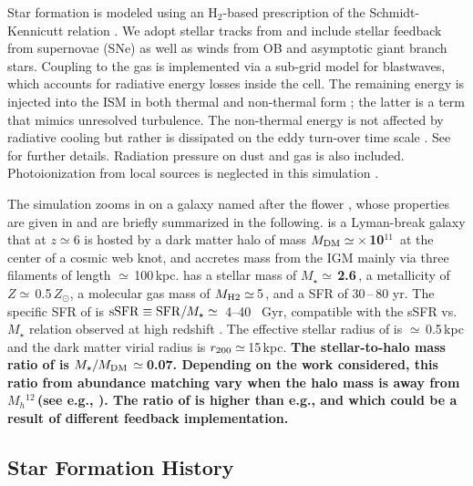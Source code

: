 \IfFileExists{emulateapjlegacy.cls}{\documentclass[iop]{emulateapjlegacy}}{\documentclass[iop]{emulateapj}}
\begin{document}
Star formation is modeled using an H$_2$-based prescription of the Schmidt-Kennicutt relation \citep{Krumholz09a}. We adopt stellar tracks from  and include stellar feedback from supernovae (SNe) as well as winds from OB and asymptotic giant branch stars. Coupling to the gas is implemented via a sub-grid model for blastwaves, which accounts for radiative energy losses inside the cell.
%
The remaining energy is injected into the ISM in both thermal and non-thermal form \citep{Agertz13a}; the latter is a term that mimics unresolved turbulence. The non-thermal energy is not affected by radiative cooling but rather is dissipated on the eddy turn-over time scale \citep{Maclow99a}. See \citet{Pallottini17b} for further details.
%
Radiation pressure on dust and gas is also included. Photoionization from local sources is neglected in this simulation \citep[see][for its effect]{Pallottini19a, Decataldo19a}.

The simulation zooms in on a galaxy named after the flower \flower, whose properties are given in \citet{Pallottini17a} and are briefly summarized in the following. \flower is a Lyman-break galaxy that at $z\simeq 6$ is hosted by a dark matter halo of mass 
{\bf $M_{\rm DM}\simeq$\,$\times$\,10$^{11}$\,\Msun} at the center of a cosmic web knot, and accretes mass from the IGM mainly via three filaments of length $\simeq$\,100\,kpc. \flower has a stellar mass of {\bf $M_\star\simeq$\,2.6\,\Msun}, a metallicity of $Z\simeq$\,0.5\,$Z_{\odot}$, a molecular gas mass of $M_{\rm H2}\simeq$\,5\,\Msun, and a SFR of 30\,--\,80\,\Msun\,yr\pmOne.
%
The specific SFR of \flower is ${\rm sSFR} \equiv {\rm SFR}/M_{\star} \simeq$~4--40 ~Gyr\pmOne, compatible with the sSFR vs.\ $M_{\star}$ relation observed at high redshift \citep{Jiang16a}. The effective stellar radius of \flower is $\simeq$\,0.5\,kpc and the dark matter virial radius is $r_{\rm 200}\simeq$\,15\,kpc.
{\bf The stellar-to-halo mass ratio of \flower is $M_\star/M_{\rm DM}\,\simeq\,$0.07.
Depending on the work considered, this ratio from abundance matching vary when the halo mass is away from $M_h$$^{12}$\,\Msun (see e.g., \citealt{Moster13a, Behroozi13b, Behroozi15a, Moster18a}). The ratio of \flower is higher than e.g., \citet{Katz17a}  and \citet{Ceverino17a} which could be a result of different feedback implementation.
}


\subsection{Star Formation History} \label{sec:sfh}
\end{document}
